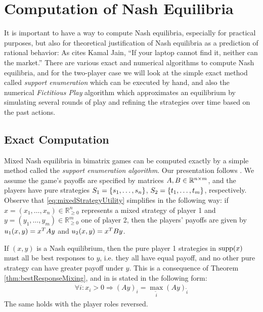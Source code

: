 \documentclass[a4paper]{scrreprt}
\newcommand{\Rp}{\mathbb{R}_{\geq 0}}
\begin{document}
    
    \section{Computation of Nash Equilibria}
    It is important to have a way to compute Nash equilibria, especially for practical purposes, but also for theoretical justification of Nash equilibria as a prediction of rational behavior: As \cite[p.30]{bib:nisanAlgorithmicGameTheoryCh2ComplexityNash} cites Kamal Jain, “If your laptop cannot
find it, neither can the market.” There are various exact and numerical algorithms to compute Nash equilibria, and for the two-player case we will look at the simple exact method called \emph{support enumeration} which can be executed by hand, and also the numerical \emph{Fictitious Play} algorithm which approximates an equilibrium by simulating several rounds of play and refining the strategies over time based on the past actions.
    
    \subsection{Exact Computation}
    Mixed Nash equilibria in bimatrix games can be computed exactly by a simple method called the \emph{support enumeration algorithm}.
    Our presentation follows \cite{bib:nisanAlgorithmicGameTheoryCh3EquilibriumComputation}.
    We assume the game's payoffs are specified by matrices $A, B \in \mathbb{R}^{n\times m}$, and the players have pure strategies $S_1 = \{s_1,\dots,s_n\}$, $S_2 = \{t_1,\dots,t_m\}$, respectively.
    Observe that \eqref{eq:mixedStrategyUtility} simplifies in the following way: if $x = (x_1,\dots,x_n) \in \Rp^n$ represents a mixed strategy of player 1 and $y = (y_1,\dots,y_m) \in \Rp^m$ one of player 2, then the players' payoffs are given by $u_1(x,y) = x^{T} A y$ and $u_2(x,y) = x^{T} B y$. 
    
    If $(x, y)$ is a Nash equilibrium, then the pure player 1 strategies in $\operatorname{supp}(x)$ must all be best responses to $y$, i.e. they all have equal payoff, and no other pure strategy can have greater payoff under $y$. This is a consequence of Theorem \ref{thm:bestResponseMixing}, and in \cite[p.55]{bib:nisanAlgorithmicGameTheoryCh3EquilibriumComputation} is stated in the following form:
    \begin{gather}
        \forall i: x_i > 0 \Rightarrow (Ay)_i = \max_{\tilde{i}} (Ay)_{\tilde{i}}
        \label{eq:equalMaxPureStrategyPayoffsLinearSystem}
    \end{gather}
    The same holds with the player roles reversed.
    
\end{document}
